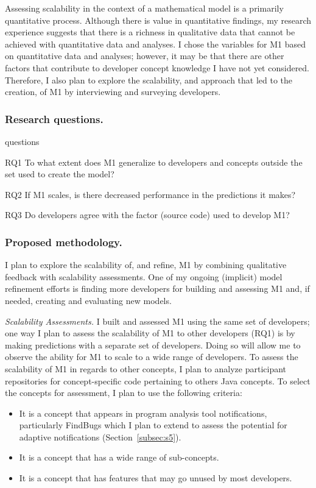 \documentclass{llncs}
\begin{document}
Assessing scalability in the context of a mathematical model is a primarily quantitative process. Although there is value in quantitative findings, my research experience suggests that there is a richness in qualitative data that cannot be achieved with quantitative data and analyses. I chose the variables for M1 based on quantitative data and analyses; however, it may be that there are other factors that contribute to developer concept knowledge I have not yet considered. Therefore, I also plan to explore the scalability, and approach that led to the creation, of M1 by interviewing and surveying developers. 

\subsubsection{Research questions.}

\begin{labeling}{questions}
	\item [RQ1] To what extent does M1 generalize to developers and concepts outside the set used to create the model?
	\item [RQ2] If M1 scales, is there decreased performance in the predictions it makes?
	\item [RQ3] Do developers agree with the factor (source code) used to develop M1?
\end{labeling}

\subsubsection{Proposed methodology.}
I plan to explore the scalability of, and refine, M1 by combining qualitative feedback with scalability assessments. One of my ongoing (implicit) model refinement efforts is finding more developers for building and assessing M1 and, if needed, creating and evaluating new models.

\vspace{0.5em}
\noindent\textit{Scalability Assessments.}
I built and assessed M1 using the same set of developers; one way I plan to assess the scalability of M1 to other developers (RQ1) is by making predictions with a separate set of developers. Doing so will allow me to observe the ability for M1 to scale to a wide range of developers. 
To assess the scalability of M1 in regards to other concepts, I plan to analyze participant repositories for concept-specific code pertaining to others Java concepts. 
To select the concepts for assessment, I plan to use the following criteria:
\begin{itemize}
	\item It is a concept that appears in program analysis tool notifications, particularly FindBugs which I plan to extend to assess the potential for adaptive notifications (Section~\ref{subsec:s5}).
	\item It is a concept that has a wide range of sub-concepts.
	\item It is a concept that has features that may go unused by most developers.
\end{itemize}
\end{document}
